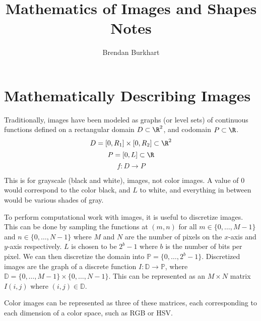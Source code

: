 \documentclass[12pt]{article}
\begin{document}
\title{Mathematics of Images and Shapes Notes}
\author{Brendan Burkhart}
\maketitle

\tableofcontents
\newpage

\section{Mathematically Describing Images}

Traditionally, images have been modeled as graphs (or level sets) of continuous functions defined on a rectangular domain $D \subset \R^2$, and codomain $P \subset \R$. \[D = \left[0, R_1\right] \times \left[0, R_2\right] \subset \R^2\] \[P = \left[0, L\right] \subset \R\] \[f : D \to P\]

\begin{note}
    This is for grayscale (black and white), images, not color images. A value of $0$ would correspond to the color black, and $L$ to white, and everything in between would be various shades of gray.
\end{note}

To perform computational work with images, it is useful to discretize images. This can be done by sampling the functions at $(m, n)$ for all $m \in \{0, \ldots, M-1\}$ and $n \in \{0, \ldots, N-1\}$ where $M$ and $N$ are the number of pixels on the $x$-axis and $y$-axis respectively. $L$ is chosen to be $2^b-1$ where $b$ is the number of bits per pixel. We can then discretize the domain into $\mathbb{P} = \{0, \ldots, 2^b-1\}$. Discretized images are the graph of a discrete function $I: \mathbb{D} \to \mathbb{P}$, where $\mathbb{D} = \{0, \ldots, M-1\} \times \{0, \ldots, N-1\}$. This can be represented as an $M \times N$ matrix $I(i, j)$ where $(i, j) \in \mathbb{D}$.

Color images can be represented as three of these matrices, each corresponding to each dimension of a color space, such as RGB or HSV. 
\end{document}
